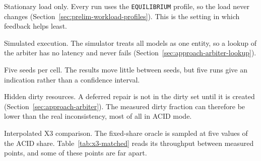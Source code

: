 \begin{bullets}
  \item[Stationary load only.] Every run uses the \texttt{EQUILIBRIUM} profile,
  so the load never changes (Section~\ref{sec:prelim-workload-profiles}). This
  is the setting in which feedback helps least.

  \item[Simulated execution.] The simulator treats all models as one entity, so
  a lookup of the arbiter has no latency and never fails
  (Section~\ref{sec:approach-arbiter-lookup}).

  \item[Five seeds per cell.] The results move little between seeds, but five
  runs give an indication rather than a confidence interval.

  \item[Hidden dirty resources.] A deferred repair is not in the dirty set until
  it is created (Section~\ref{sec:approach-arbiter}). The measured dirty
  fraction can therefore be lower than the real inconsistency, most of all in
  ACID mode.

  \item[Interpolated X3 comparison.] The fixed-share oracle is sampled at five
  values of the ACID share. Table~\ref{tab:x3-matched} reads its throughput
  between measured points, and some of these points are far apart.
\end{bullets}
